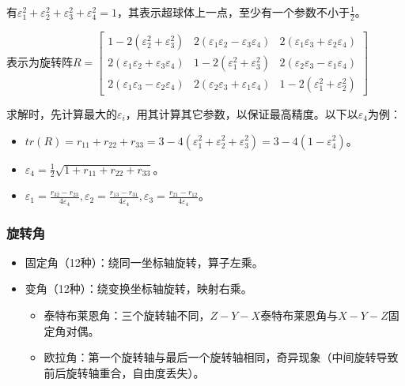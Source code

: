 \documentclass[
12pt, %
a4paper, 
oneside, %
headinclude,footinclude, %
]{scrartcl}
\begin{document}
有$ \varepsilon_1^2 + \varepsilon_2^2 + \varepsilon_3^2 + \varepsilon_4^2 = 1 $，其表示超球体上一点，至少有一个参数不小于$ \frac{1}{2} $。

表示为旋转阵$ R = \begin{bmatrix} 1 - 2(\varepsilon_2^2 + \varepsilon_3^2) & 2(\varepsilon_1 \varepsilon_2 - \varepsilon_3 \varepsilon_4) & 2(\varepsilon_1 \varepsilon_3 + \varepsilon_2 \varepsilon_4) \\ 2(\varepsilon_1 \varepsilon_2 + \varepsilon_3 \varepsilon_4) & 1 - 2(\varepsilon_1^2 + \varepsilon_3^2) & 2(\varepsilon_2 \varepsilon_3 - \varepsilon_1 \varepsilon_4) \\ 2(\varepsilon_1 \varepsilon_3 - \varepsilon_2 \varepsilon_4) & 2(\varepsilon_2 \varepsilon_3 + \varepsilon_1 \varepsilon_4) & 1 - 2(\varepsilon_1^2 + \varepsilon_2^2) \end{bmatrix} $

求解时，先计算最大的$ \varepsilon_i $，用其计算其它参数，以保证最高精度。以下以$ \varepsilon_4 $为例：
\begin{itemize}
\item $ tr(R) = r_{11} + r_{22} + r_{33} = 3 - 4(\varepsilon_1^2 + \varepsilon_2^2 + \varepsilon_3^2) = 3 - 4(1 - \varepsilon_4^2) $。
\item $ \varepsilon_4 = \frac{1}{2} \sqrt{1 + r_{11} + r_{22} + r_{33}} $。
\item $ \varepsilon_1 = \frac{r_{32} - r_{23}}{4 \varepsilon_4}, \varepsilon_2 = \frac{r_{13} - r_{31}}{4 \varepsilon_4}, \varepsilon_3 = \frac{r_{21} - r_{12}}{4 \varepsilon_4} $。
\end{itemize}
\subsubsection[旋转角]{旋转角}
\begin{itemize}
\item 固定角（12种）：绕同一坐标轴旋转，算子左乘。
\item 变角（12种）：绕变换坐标轴旋转，映射右乘。
\begin{itemize}
\item 泰特布莱恩角：三个旋转轴不同，$ Z-Y-X $泰特布莱恩角与$ X-Y-Z $固定角对偶。
\item 欧拉角：第一个旋转轴与最后一个旋转轴相同，奇异现象（中间旋转导致前后旋转轴重合，自由度丢失）。
\end{itemize}
\end{itemize}
\end{document}
